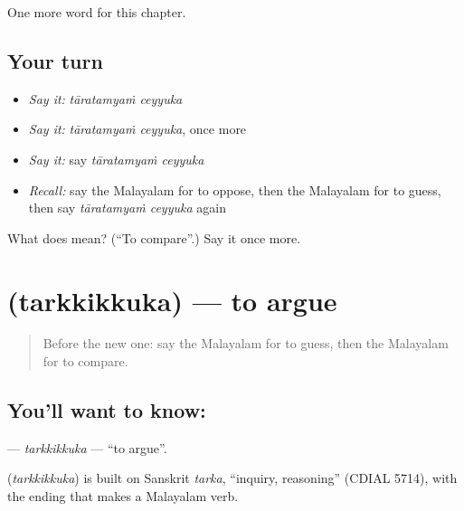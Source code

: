 \begin{grammarlens}[title={What you've built}]
One more word for this chapter.
\end{grammarlens}

\subsection*{Your turn}
\begin{itemize}
\raggedright
  \item \emph{Say it:} \emph{tāratamyaṁ ceyyuka}
  \item \emph{Say it:} \emph{tāratamyaṁ ceyyuka}, once more
  \item \emph{Say it:} say \emph{tāratamyaṁ ceyyuka}
  \item \emph{Recall:} say the Malayalam for to oppose, then the Malayalam for to guess, then say \emph{tāratamyaṁ ceyyuka} again
\end{itemize}

\begin{tcolorbox}[breakable,colback=teal!4,colframe=teal!35!black,title={Before you move on}]
What does   mean? (\textquotedblleft{}To compare\textquotedblright{}.) Say it once more.
\end{tcolorbox}
\section[\texorpdfstring{\ml{തർക്കിക്കുക} (tarkkikkuka)}{തർക്കിക്കുക (tarkkikkuka)}]{ (tarkkikkuka) — to argue}

\label{lesson:ML-C270-tarkkikkuka}



\begin{quote}
Before the new one: say the Malayalam for to guess, then the Malayalam for to compare.
\end{quote}

\subsection*{You'll want to know: }
\textbf{} — \emph{tarkkikkuka} — \textquotedblleft{}to argue\textquotedblright{}.

\begin{cousinweb}
\textbf{} (\emph{tarkkikkuka}) is built on Sanskrit \emph{tarka}, \textquotedblleft{}inquiry, reasoning\textquotedblright{} (CDIAL 5714), with the ending that makes a Malayalam verb.
\end{cousinweb}

